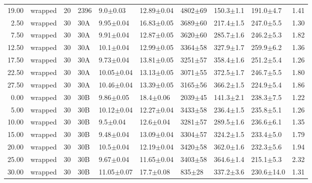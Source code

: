 \begin{tabular}{rlrllllllr}
     19.00 &       wrapped &      20 &    2396 &         9.0$\pm$0.03 &   12.89$\pm$0.04 &  4802$\pm$69 &   150.3$\pm$1.1 &   191.0$\pm$4.7 &        1.41 \\
      2.50 &       wrapped &      30 &     30A &        9.95$\pm$0.04 &   16.83$\pm$0.05 &  3689$\pm$60 &   217.4$\pm$1.5 &   247.0$\pm$5.5 &        1.30 \\
      7.50 &       wrapped &      30 &     30A &        9.91$\pm$0.04 &   12.87$\pm$0.05 &  3620$\pm$60 &   285.7$\pm$1.6 &   246.2$\pm$5.3 &        1.82 \\
     12.50 &       wrapped &      30 &     30A &        10.1$\pm$0.04 &   12.99$\pm$0.05 &  3364$\pm$58 &   327.9$\pm$1.7 &   259.9$\pm$6.2 &        1.36 \\
     17.50 &       wrapped &      30 &     30A &        9.73$\pm$0.04 &   13.81$\pm$0.05 &  3251$\pm$57 &   358.4$\pm$1.6 &   251.2$\pm$5.4 &        1.26 \\
     22.50 &       wrapped &      30 &     30A &       10.05$\pm$0.04 &   13.13$\pm$0.05 &  3071$\pm$55 &   372.5$\pm$1.7 &   246.7$\pm$5.5 &        1.80 \\
     27.50 &       wrapped &      30 &     30A &       10.46$\pm$0.04 &   13.39$\pm$0.05 &  3165$\pm$56 &   366.2$\pm$1.5 &   224.9$\pm$5.4 &        1.86 \\
      0.00 &       wrapped &      30 &     30B &        9.86$\pm$0.05 &    18.4$\pm$0.06 &  2039$\pm$45 &   141.3$\pm$2.1 &   238.3$\pm$7.5 &        1.22 \\
      5.00 &       wrapped &      30 &     30B &       10.12$\pm$0.04 &   12.27$\pm$0.04 &  3433$\pm$58 &   236.4$\pm$1.5 &   235.8$\pm$5.1 &        1.26 \\
     10.00 &       wrapped &      30 &     30B &         9.5$\pm$0.04 &    12.6$\pm$0.04 &  3281$\pm$57 &   289.5$\pm$1.6 &   236.6$\pm$6.1 &        1.35 \\
     15.00 &       wrapped &      30 &     30B &        9.48$\pm$0.04 &   13.09$\pm$0.04 &  3304$\pm$57 &   324.2$\pm$1.5 &   233.4$\pm$5.0 &        1.79 \\
     20.00 &       wrapped &      30 &     30B &        10.5$\pm$0.04 &   12.19$\pm$0.04 &  3420$\pm$58 &   362.0$\pm$1.6 &   232.3$\pm$5.6 &        1.94 \\
     25.00 &       wrapped &      30 &     30B &        9.67$\pm$0.04 &   11.65$\pm$0.04 &  3403$\pm$58 &   364.6$\pm$1.4 &   215.1$\pm$5.3 &        2.32 \\
     30.00 &       wrapped &      30 &     30B &       11.05$\pm$0.07 &    17.7$\pm$0.08 &   835$\pm$28 &   337.2$\pm$3.6 &  230.6$\pm$14.0 &        1.31 \\
\hline
\end{tabular}